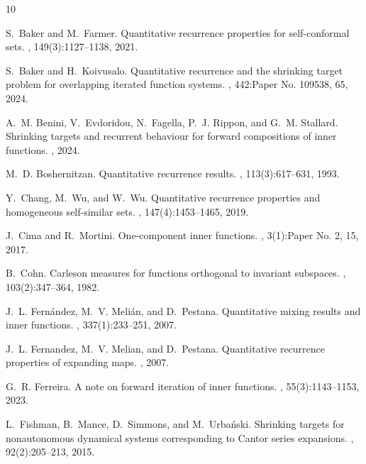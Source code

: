 \documentclass[11pt,reqno]{amsart}
\newcommand{\0}{\mathbf{0}}
\theoremstyle{remark}
\numberwithin{equation}{section}
\theoremstyle{remark}
\numberwithin{equation}{section}
\begin{document}
\begin{thebibliography}{10}

S.~Baker and M.~Farmer.
\newblock Quantitative recurrence properties for self-conformal sets.
, 149(3):1127--1138, 2021.

S.~Baker and H.~Koivusalo.
\newblock Quantitative recurrence and the shrinking target problem for
  overlapping iterated function systems.
, 442:Paper No. 109538, 65, 2024.

A.~M. Benini, V.~Evdoridou, N.~Fagella, P.~J. Rippon, and G.~M. Stallard.
\newblock Shrinking targets and recurrent behaviour for forward compositions of
  inner functions.
, 2024.

M.~D. Boshernitzan.
\newblock Quantitative recurrence results.
, 113(3):617--631, 1993.

Y.~Chang, M.~Wu, and W.~Wu.
\newblock Quantitative recurrence properties and homogeneous self-similar sets.
, 147(4):1453--1465, 2019.

J.~Cima and R.~Mortini.
\newblock One-component inner functions.
, 3(1):Paper No. 2, 15, 2017.

B.~Cohn.
\newblock Carleson measures for functions orthogonal to invariant subspaces.
, 103(2):347--364, 1982.

J.~L. Fern\'andez, M.~V. Meli\'an, and D.~Pestana.
\newblock Quantitative mixing results and inner functions.
, 337(1):233--251, 2007.

J.~L. Fernandez, M.~V. Melian, and D.~Pestana.
\newblock Quantitative recurrence properties of expanding maps.
, 2007.

G.~R. Ferreira.
\newblock A note on forward iteration of inner functions.
, 55(3):1143--1153,
  2023.

L.~Fishman, B.~Mance, D.~Simmons, and M.~Urba\'nski.
\newblock Shrinking targets for nonautonomous dynamical systems corresponding
  to {C}antor series expansions.
, 92(2):205--213, 2015.


\end{thebibliography}
\end{document}
